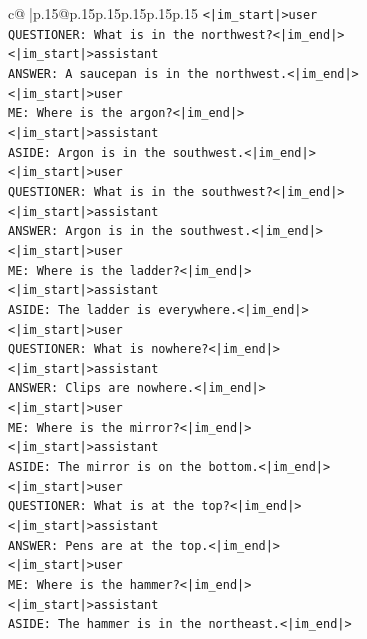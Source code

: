 \documentclass{article}
\begin{document}
{\begin{supertabular}{c@{$\;$}|p{.15\linewidth}@{}p{.15\linewidth}p{.15\linewidth}p{.15\linewidth}p{.15\linewidth}p{.15\linewidth}}
{{{\texttt{<|im\_start|>user} \\
\texttt{QUESTIONER: What is in the northwest?<|im\_end|>} \\
\texttt{<|im\_start|>assistant} \\
\texttt{ANSWER: A saucepan is in the northwest.<|im\_end|>} \\
\texttt{<|im\_start|>user} \\
\texttt{ME: Where is the argon?<|im\_end|>} \\
\texttt{<|im\_start|>assistant} \\
\texttt{ASIDE: Argon is in the southwest.<|im\_end|>} \\
\texttt{<|im\_start|>user} \\
\texttt{QUESTIONER: What is in the southwest?<|im\_end|>} \\
\texttt{<|im\_start|>assistant} \\
\texttt{ANSWER: Argon is in the southwest.<|im\_end|>} \\
\texttt{<|im\_start|>user} \\
\texttt{ME: Where is the ladder?<|im\_end|>} \\
\texttt{<|im\_start|>assistant} \\
\texttt{ASIDE: The ladder is everywhere.<|im\_end|>} \\
\texttt{<|im\_start|>user} \\
\texttt{QUESTIONER: What is nowhere?<|im\_end|>} \\
\texttt{<|im\_start|>assistant} \\
\texttt{ANSWER: Clips are nowhere.<|im\_end|>} \\
\texttt{<|im\_start|>user} \\
\texttt{ME: Where is the mirror?<|im\_end|>} \\
\texttt{<|im\_start|>assistant} \\
\texttt{ASIDE: The mirror is on the bottom.<|im\_end|>} \\
\texttt{<|im\_start|>user} \\
\texttt{QUESTIONER: What is at the top?<|im\_end|>} \\
\texttt{<|im\_start|>assistant} \\
\texttt{ANSWER: Pens are at the top.<|im\_end|>} \\
\texttt{<|im\_start|>user} \\
\texttt{ME: Where is the hammer?<|im\_end|>} \\
\texttt{<|im\_start|>assistant} \\
\texttt{ASIDE: The hammer is in the northeast.<|im\_end|>} \\
}}}
\end{supertabular}}
\end{document}
